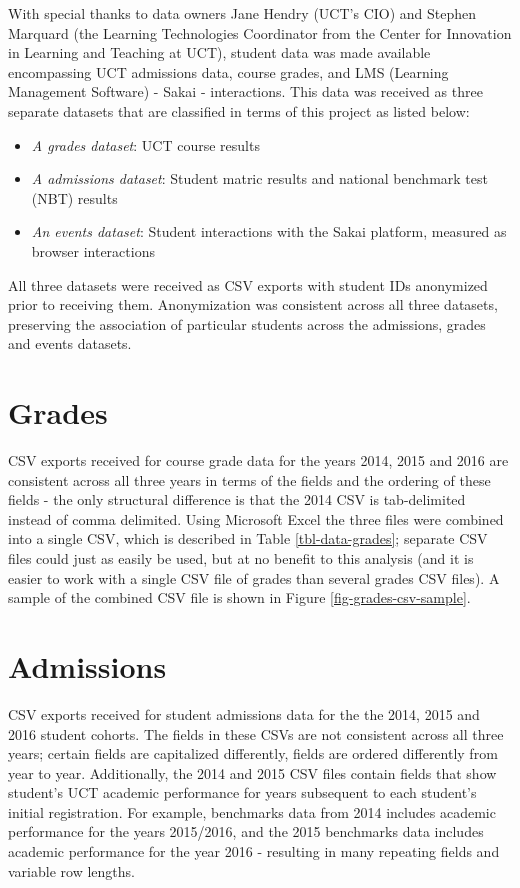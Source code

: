 With special thanks to data owners Jane Hendry (UCT's CIO) and Stephen Marquard (the Learning Technologies Coordinator from the Center for Innovation in Learning and Teaching at UCT), student data was made available encompassing UCT admissions data, course grades, and LMS (Learning Management Software) - Sakai \cite{sakai} - interactions. This data was received as three separate datasets that are classified in terms of this project as listed below:

\begin{itemize}
    \item \textit{A grades dataset}: UCT course results
    \item \textit{A admissions dataset}: Student matric results and national benchmark test (NBT) results
    \item \textit{An events dataset}: Student interactions with the Sakai platform, measured as browser interactions
\end{itemize}

All three datasets were received as CSV exports with student IDs anonymized prior to receiving them. Anonymization was consistent across all three datasets, preserving the association of particular students across the admissions, grades and events datasets.

\section{Grades}
CSV exports received for course grade data for the years 2014, 2015 and 2016 are consistent across all three years in terms of the fields and the ordering of these fields - the only structural difference is that the 2014 CSV is tab-delimited instead of comma delimited. Using Microsoft Excel the three files were combined into a single CSV, which is described in Table \ref{tbl-data-grades}; separate CSV files could just as easily be used, but at no benefit to this analysis (and it is easier to work with a single CSV file of grades than several grades CSV files). A sample of the combined CSV file is shown in Figure \ref{fig-grades-csv-sample}.




\section{Admissions}
CSV exports received for student admissions data for the the 2014, 2015 and 2016 student cohorts. The fields in these CSVs are not consistent across all three years; certain fields are capitalized differently, fields are ordered differently from year to year. Additionally, the 2014 and 2015 CSV files contain fields that show student's UCT academic performance for years subsequent to each student's initial registration. For example, benchmarks data from 2014 includes academic performance for the years 2015/2016, and the 2015 benchmarks data includes academic performance for the year 2016 - resulting in many repeating fields and variable row lengths.

